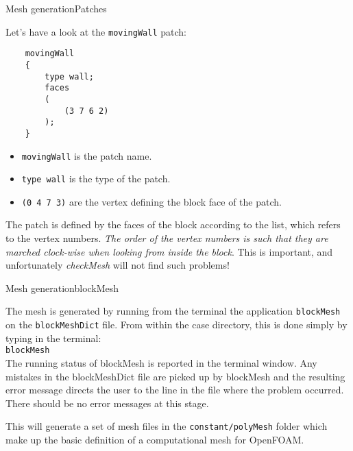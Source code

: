 \documentclass{beamer}
\begin{document}
\begin{frame}[fragile]{Mesh generation}{Patches}

Let's have a look at the \texttt{movingWall} patch:

\begin{lrbox}{\mybox}
  \begin{minipage}{12em}
\begin{scriptsize}
\begin{verbatim}
    movingWall
    {
        type wall;
        faces
        (
            (3 7 6 2)
        );
    }
\end{verbatim}
\end{scriptsize}
\end{minipage}
\end{lrbox}

\fbox{\usebox\mybox}



\begin{itemize}
\item \texttt{movingWall} is the patch name.
\item \texttt{type wall} is the type of the patch.
\item \texttt{(0 4 7 3)} are the vertex defining the block face of the patch.
\end{itemize}

\begin{block}

{\footnotesize The patch is defined by the faces of the block according to the list, which refers
to the vertex numbers. \emph{The order of the vertex numbers is such that they are
marched clock-wise when looking from inside the block}. This is important, and
unfortunately \emph{checkMesh} will not find such problems!}
\end{block}

\end{frame}

\begin{frame}{Mesh generation}{blockMesh}

The mesh is generated by running from the terminal the application \texttt{blockMesh} on the \texttt{blockMeshDict} file. From within
the case directory, this is done simply by typing in the terminal:\\[0.2cm]

\texttt{blockMesh}\\[0.2cm]

The running status of blockMesh is reported in the terminal window. Any mistakes in the
blockMeshDict file are picked up by blockMesh and the resulting error message directs
the user to the line in the file where the problem occurred. There should be no error
messages at this stage. 

This will generate a set of mesh files in the \texttt{constant/polyMesh} folder which make up the basic definition of a computational mesh for OpenFOAM.

\end{frame}
\end{document}
